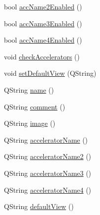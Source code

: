 \begin{DoxyCompactItemize}
\item 
bool \hyperlink{classAction_a623a08e84bed0dac6741348c30a47420}{accName2Enabled} ()
\item 
bool \hyperlink{classAction_a51680d60a7413f60eb2d5c6c21c269eb}{accName3Enabled} ()
\item 
bool \hyperlink{classAction_a89e48238e97cae2c0da883fa1897a87f}{accName4Enabled} ()
\item 
void \hyperlink{classAction_a2a6bf37306a598fab26baa2edc831422}{checkAccelerators} ()
\item 
void \hyperlink{classAction_a11335bd5aa3730a6136b8e53164043be}{setDefaultView} (QString)
\item 
QString \hyperlink{classAction_a536425b6315cb8801058671139a67c2a}{name} ()
\item 
QString \hyperlink{classAction_a26224e312a1101754de548d7a342db67}{comment} ()
\item 
QString \hyperlink{classAction_a0e15f30ba83b6e444e5f4cec37c4f0e8}{image} ()
\item 
QString \hyperlink{classAction_a9a99731f4412f9db44ad412f7cf5d2e7}{acceleratorName} ()
\item 
QString \hyperlink{classAction_ac9fb9c769be6415492d9c1a47546aa21}{acceleratorName2} ()
\item 
QString \hyperlink{classAction_a84303051210d1d003c7e13a59629e0da}{acceleratorName3} ()
\item 
QString \hyperlink{classAction_ae76effe846fe9b67dc1c159a4bcfa141}{acceleratorName4} ()
\item 
QString \hyperlink{classAction_aa26f9ce4c941d7aaf1ac2929707f0b21}{defaultView} ()
\end{DoxyCompactItemize}
